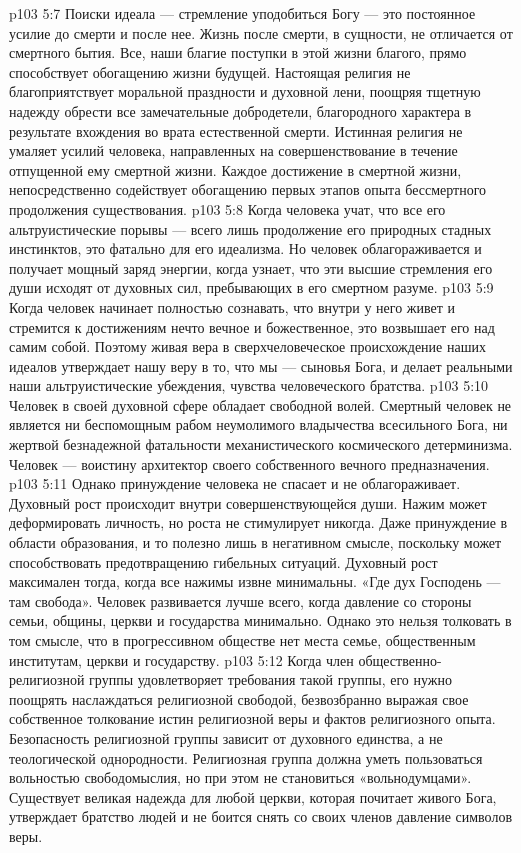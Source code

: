 \vs p103 5:7 \pc Поиски идеала --- стремление уподобиться Богу --- это постоянное усилие до смерти и после нее. Жизнь после смерти, в сущности, не отличается от смертного бытия. Все, наши благие поступки в этой жизни благого, прямо способствует обогащению жизни будущей. Настоящая религия не благоприятствует моральной праздности и духовной лени, поощряя тщетную надежду обрести все замечательные добродетели, благородного характера в результате вхождения во врата естественной смерти. Истинная религия не умаляет усилий человека, направленных на совершенствование в течение отпущенной ему смертной жизни. Каждое достижение в смертной жизни, непосредственно содействует обогащению первых этапов опыта бессмертного продолжения существования.
\vs p103 5:8 \pc Когда человека учат, что все его альтруистические порывы --- всего лишь продолжение его природных стадных инстинктов, это фатально для его идеализма. Но человек облагораживается и получает мощный заряд энергии, когда узнает, что эти высшие стремления его души исходят от духовных сил, пребывающих в его смертном разуме.
\vs p103 5:9 Когда человек начинает полностью сознавать, что внутри у него живет и стремится к достижениям нечто вечное и божественное, это возвышает его над самим собой. Поэтому живая вера в сверхчеловеческое происхождение наших идеалов утверждает нашу веру в то, что мы --- сыновья Бога, и делает реальными наши альтруистические убеждения, чувства человеческого братства.
\vs p103 5:10 Человек в своей духовной сфере обладает свободной волей. Смертный человек не является ни беспомощным рабом неумолимого владычества всесильного Бога, ни жертвой безнадежной фатальности механистического космического детерминизма. Человек --- воистину архитектор своего собственного вечного предназначения.
\vs p103 5:11 \pc Однако принуждение человека не спасает и не облагораживает. Духовный рост происходит внутри совершенствующейся души. Нажим может деформировать личность, но роста не стимулирует никогда. Даже принуждение в области образования, и то полезно лишь в негативном смысле, поскольку может способствовать предотвращению гибельных ситуаций. Духовный рост максимален тогда, когда все нажимы извне минимальны. «Где дух Господень --- там свобода». Человек развивается лучше всего, когда давление со стороны семьи, общины, церкви и государства минимально. Однако это нельзя толковать в том смысле, что в прогрессивном обществе нет места семье, общественным институтам, церкви и государству.
\vs p103 5:12 Когда член общественно\hyp{}религиозной группы удовлетворяет требования такой группы, его нужно поощрять наслаждаться религиозной свободой, безвозбранно выражая свое собственное толкование истин религиозной веры и фактов религиозного опыта. Безопасность религиозной группы зависит от духовного единства, а не теологической однородности. Религиозная группа должна уметь пользоваться вольностью свободомыслия, но при этом не становиться «вольнодумцами». Существует великая надежда для любой церкви, которая почитает живого Бога, утверждает братство людей и не боится снять со своих членов давление символов веры.
